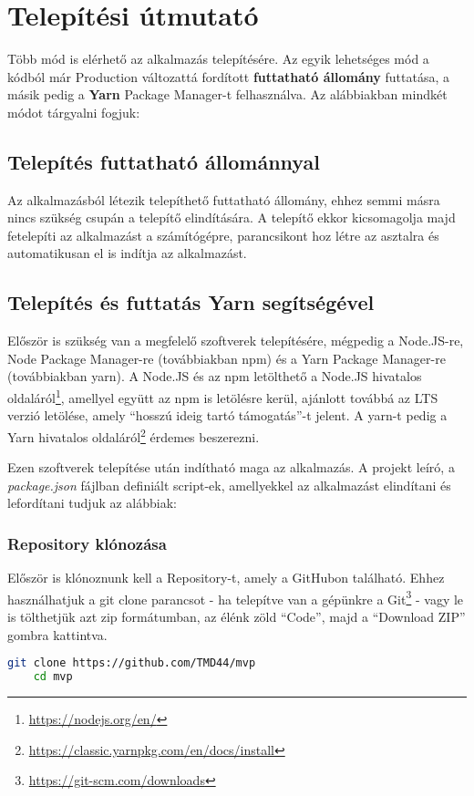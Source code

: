 \section{Telepítési útmutató}
Több mód is elérhető az alkalmazás telepítésére. Az egyik lehetséges mód a kódból már Production változattá fordított {\textbf {futtatható állomány}} futtatása, a másik pedig a {\textbf {Yarn}} Package Manager-t felhasználva. Az alábbiakban mindkét módot tárgyalni fogjuk:

\subsection{Telepítés futtatható állománnyal}
Az alkalmazásból létezik telepíthető futtatható állomány, ehhez semmi másra nincs szükség csupán a telepítő elindítására. A telepítő ekkor kicsomagolja majd fetelepíti az alkalmazást a számítógépre, parancsikont hoz létre az asztalra és automatikusan el is indítja az alkalmazást.

\subsection{Telepítés és futtatás Yarn segítségével}
Először is szükség van a megfelelő szoftverek telepítésére, mégpedig a Node.JS-re, Node Package Manager-re (továbbiakban npm) és a Yarn Package Manager-re (továbbiakban yarn). A Node.JS és az npm letölthető a Node.JS hivatalos oldaláról\footnote{\url{https://nodejs.org/en/}}, amellyel együtt az npm is letölésre kerül, ajánlott továbbá az LTS verzió letölése, amely ``hosszú ideig tartó támogatás''-t jelent. A yarn-t pedig a Yarn hivatalos oldaláról\footnote{\url{https://classic.yarnpkg.com/en/docs/install}} érdemes beszerezni.

Ezen szoftverek telepítése után indítható maga az alkalmazás. A projekt leíró, a {\it package.json} fájlban definiált script-ek, amellyekkel az alkalmazást elindítani és lefordítani tudjuk az alábbiak:

\subsubsection{Repository klónozása}
Először is klónoznunk kell a Repository-t, amely a GitHubon található. Ehhez használhatjuk a git clone parancsot - ha telepítve van a gépünkre a Git\footnote{\url{https://git-scm.com/downloads}} - vagy le is tölthetjük azt zip formátumban, az élénk zöld ``Code'', majd a ``Download ZIP'' gombra kattintva.
\begin{lstlisting}[language={Bash}, numbers={none}]
    git clone https://github.com/TMD44/mvp
    cd mvp
\end{lstlisting}

